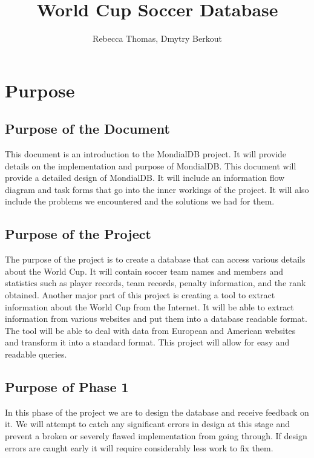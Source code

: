 \documentclass{article}
\title{World Cup Soccer Database}
\author{Rebecca Thomas, Dmytry Berkout}
\begin{document}
\maketitle
\hypersetup{linktoc=all, linktocpage}
\setcounter{tocdepth}{2}
\tableofcontents{}
\newpage

\section{Purpose}
\subsection{Purpose of the Document}
This document is an introduction to the MondialDB project. It will provide details on the implementation and purpose of MondialDB. This document will provide a detailed design of MondialDB. It will include an information flow diagram and task forms that go into the inner workings of the project. It will also include the problems we encountered and the solutions we had for them.

\subsection{Purpose of the Project}
The purpose of the project is to create a database that can access various details about the World Cup. It will contain soccer team names and members and statistics such as player records, team records, penalty information, and the rank obtained. Another major part of this project is creating a tool to extract information about the World Cup from the Internet. It will be able to extract information from various websites and put them into a database readable format. The tool will be able to deal with data from European and American websites and transform it into a standard format. This project will allow for easy and readable queries.

\subsection{Purpose of Phase 1}
In this phase of the project we are to design the database and receive feedback on it. We will attempt to catch any significant errors in design at this stage and prevent a broken or severely flawed implementation from going through. If design errors are caught early it will require considerably less work to fix them. 
\end{document}
